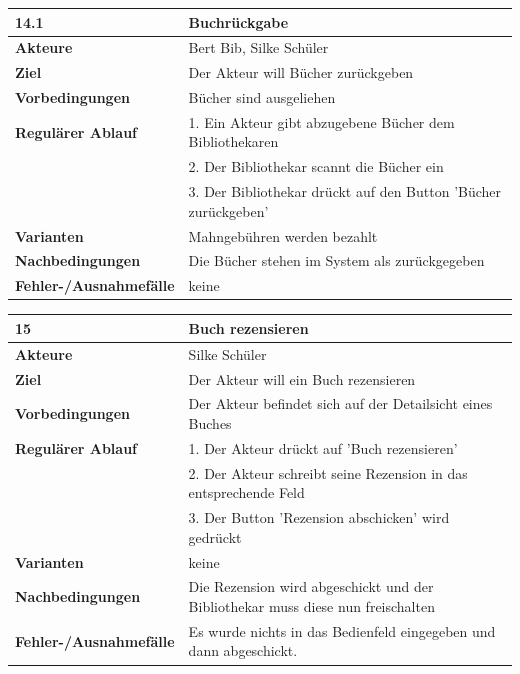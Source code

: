 \documentclass[fontsize=12pt,paper=a4,twoside]{scrartcl}
\begin{document}
\newpage
\begin{table}[htbp]
\label{14.1}
\begin{tabular}{|l|p{10cm}|}
\hline 
\textbf{14.1} & \textbf{Buchrückgabe} \\ \hline
\textbf{Akteure} & Bert Bib, Silke Schüler\\ \hline
\textbf{Ziel} & Der Akteur will Bücher zurückgeben \\ \hline
\textbf{Vorbedingungen} & Bücher sind ausgeliehen \\ \hline
\textbf{Regulärer Ablauf} & 
1. Ein Akteur gibt abzugebene Bücher dem Bibliothekaren \\
&2. Der Bibliothekar scannt die Bücher ein\\
&3. Der Bibliothekar drückt auf den Button 'Bücher zurückgeben'\\
\hline
\textbf{Varianten} & 
Mahngebühren werden bezahlt \\ \hline
\textbf{Nachbedingungen} & Die Bücher stehen im System als zurückgegeben\\ \hline
\textbf{Fehler-/Ausnahmefälle} & keine\\
\hline
\end{tabular}
\end{table}
\newpage
\begin{table}[htbp]
\label{15}
\begin{tabular}{|l|p{10cm}|}
\hline 
\textbf{15} & \textbf{Buch rezensieren} \\ \hline
\textbf{Akteure} & Silke Schüler\\ \hline
\textbf{Ziel} & Der Akteur will ein Buch rezensieren \\ \hline
\textbf{Vorbedingungen} & Der Akteur befindet sich auf der Detailsicht eines Buches \\ \hline
\textbf{Regulärer Ablauf} & 
1. Der Akteur drückt auf 'Buch rezensieren' \\
&2. Der Akteur schreibt seine Rezension in das entsprechende Feld\\
&3. Der Button 'Rezension abschicken' wird gedrückt\\
\hline
\textbf{Varianten} & 
keine \\ \hline
\textbf{Nachbedingungen} & Die Rezension wird abgeschickt und der Bibliothekar muss diese nun 
freischalten\\ \hline
\textbf{Fehler-/Ausnahmefälle} & Es wurde nichts in das Bedienfeld eingegeben und dann abgeschickt.\\
\hline
\end{tabular}
\end{table}
\end{document}
